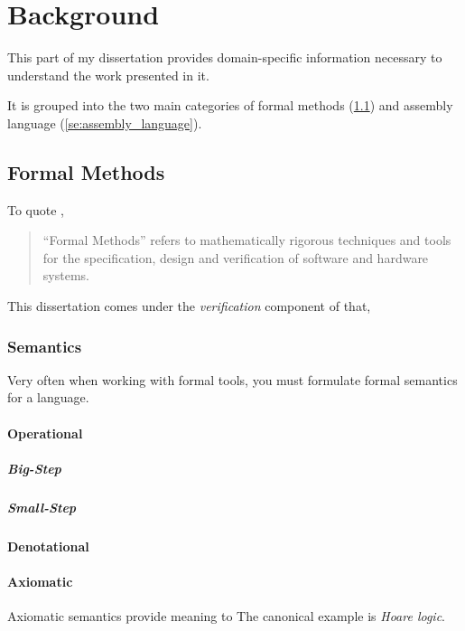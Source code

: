 \chapter{Background}\label{ch:background}
This part of my dissertation provides domain-specific information necessary to understand
the work presented in it.

It is grouped into the two main categories of
formal methods (\cref{se:formal_methods})
and assembly language (\cref{se:assembly_language}).

\section{Formal Methods}\label{se:formal_methods}
To quote \textcite{butler:fm},
\begin{quote}
  ``Formal Methods''%
  refers to mathematically rigorous techniques and tools
  for the specification, design and verification of software and hardware systems.
\end{quote}
This dissertation comes under the \emph{verification} component of that,%

\subsection{Semantics}
Very often when working with formal tools, you must formulate formal semantics
for a language.

\Textcite{schmidt2003pls}

\subsubsection{Operational}
\paragraph{Big-Step}
\paragraph{Small-Step}

\subsubsection{Denotational}

\subsubsection{Axiomatic}
Axiomatic semantics provide meaning to 
The canonical example is \emph{Hoare logic}.%


